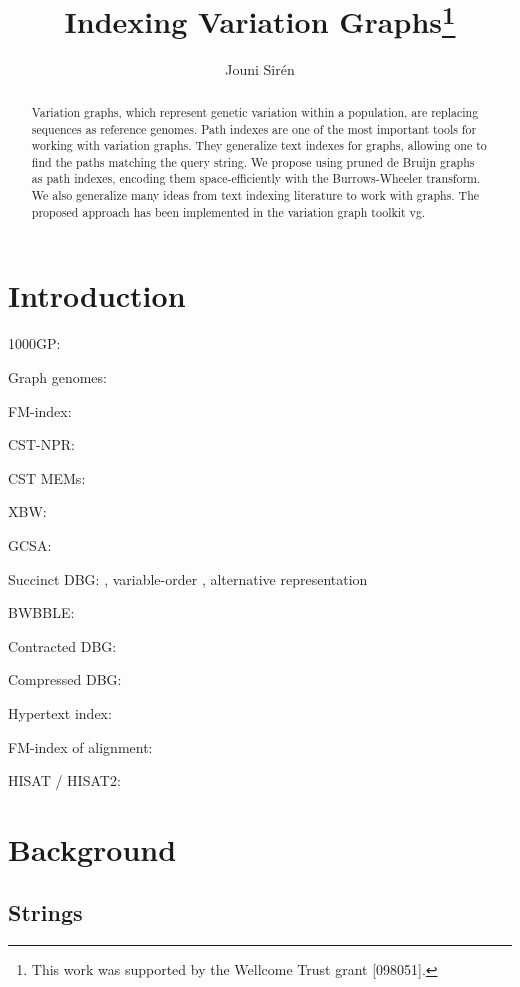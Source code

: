 \documentclass[a4paper,UKenglish]{lipics-v2016}
\title{Indexing Variation Graphs\footnote{This work was supported by the Wellcome Trust grant [098051].}}
\author[1]{Jouni Sirén}
\affil[1]{Wellcome Trust Sanger Institute, Hinxton, Cambridge, UK\\
  \texttt{jouni.siren@iki.fi}}
\begin{document}
\maketitle

\begin{abstract}
Variation graphs, which represent genetic variation within a population, are replacing sequences as reference genomes. Path indexes are one of the most important tools for working with variation graphs. They generalize text indexes for graphs, allowing one to find the paths matching the query string. We propose using pruned de Bruijn graphs as path indexes, encoding them space-efficiently with the Burrows-Wheeler transform. We also generalize many ideas from text indexing literature to work with graphs. The proposed approach has been implemented in the variation graph toolkit vg.
\end{abstract}


\section{Introduction}

1000GP: \cite{1000GP2015}

Graph genomes: \cite{Schneeberger2009}

FM-index: \cite{Ferragina2005a}

CST-NPR: \cite{Fischer2009a}

CST MEMs: \cite{Ohlebusch2010a}

XBW: \cite{Ferragina2009b}

GCSA: \cite{Siren2014}

Succinct DBG: \cite{Bowe2012}, variable-order \cite{Boucher2014}, alternative representation \cite{Roedland2013}

BWBBLE: \cite{Huang2013}

Contracted DBG: \cite{Cazaux2014}

Compressed DBG: \cite{Marcus2014}

Hypertext index: \cite{Thachuk2013}

FM-index of alignment: \cite{Na2015}

HISAT / HISAT2: \cite{Kim2015}


\section{Background}

\subsection{Strings}\label{sect:strings}
\end{document}

